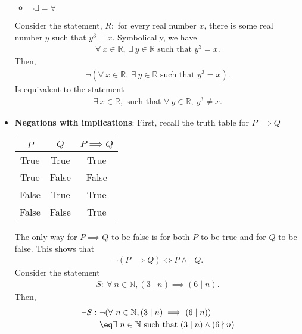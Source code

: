 \documentclass{report}
\begin{document}
\begin{itemize}
\begin{itemize}
            \item $\neg\exists = \forall $ 
        \end{itemize}
        Consider the statement, $R: $ for every real number $x$, there is some real number $y$ such that $y^{3} = x $. Symbolically, we have
        \begin{align*}
            \forall\ x\in \mathbb{R},\ \exists \ y\in \mathbb{R} \text{ such that } y^{3} = x
        .\end{align*}
        Then,
        \begin{align*}
            \neg(\forall\ x\in \mathbb{R},\ \exists \ y\in \mathbb{R} \text{ such that } y^{3} = x)
        .\end{align*}
        Is equivalent to the statement
        \begin{align*}
            \exists \ x\in \mathbb{R}, \text{ such that } \forall \ y\in \mathbb{R},\ y^{3} \ne x
        .\end{align*}
    \item \textbf{Negations with implications}: First, recall the truth table for $P\implies Q$
        \begin{center}
            \begin{tabular}{c|c|c}
                $P$& $Q$ & $P\implies Q $ \\
                \hline
                True  & True & True \\
                True & False & False \\
                False & True & True \\
                False & False & True
            \end{tabular}
        \end{center}
        \bigbreak \noindent 
        The only way for $P \implies Q$ to be false is for both $P$ to be true and for $Q$ to be false. This shows that
        \begin{align*}
            \neg(P \implies Q) \Leftrightarrow P \land \neg Q
        .\end{align*}
        Consider the statement
        \begin{align*}
            S:\ \forall \ n \in \mathbb{N}, (3\mid n) \implies (6\mid n)
        .\end{align*}
        Then,
        \begin{align*}
            \neg S:\ &\neg( \forall \ n \in \mathbb{N}, (3\mid n) \implies (6\mid n)) \\
                     &\eq \exists \ n \in \mathbb{N} \text{ such that } (3\mid n) \land (6\nmid n)

\end{align*}
\end{itemize}
\end{document}
